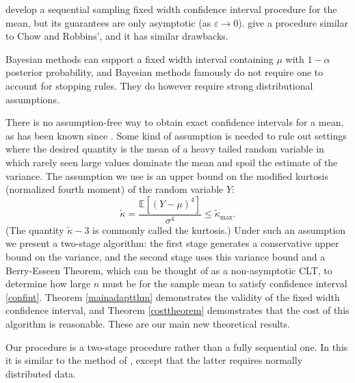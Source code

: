 \documentclass[graybox]{svmult}
\newcommand\e{\mathbb{E}}
\newcommand{\tkappa}{\tilde{\kappa}}
\begin{document}
\cite{ChoRob65a} develop a sequential sampling fixed width confidence interval procedure for the mean, but its guarantees are only asymptotic (as $\varepsilon \to 0$). \cite{MukhDatt1996} give a procedure similar to Chow and Robbins', and it has similar drawbacks.

Bayesian methods can support a fixed width
interval containing $\mu$ with $1-\alpha$ posterior probability, and
Bayesian methods famously do not require one to account
for stopping rules. They do however require strong distributional assumptions.

There is no assumption-free way to obtain exact confidence intervals for a mean,
as has been known since \cite{BahSav56}. Some kind of assumption is needed to rule out settings where the desired quantity is the
mean of a heavy tailed random variable in which
rarely seen large values dominate the mean and spoil the estimate of the variance.
The assumption we use is an upper bound on
the modified kurtosis (normalized fourth moment) of the
random variable $Y$:
\begin{equation} \label{kurtassump}
\tkappa = \frac{\e[(Y-\mu)^4]}{\sigma^4} \le \tkappa_{\max}.
\end{equation}
(The quantity $\tkappa-3$ is commonly called the kurtosis.)  Under such an assumption we present
a two-stage algorithm: the first stage generates
a conservative upper bound on the variance, and the second stage
uses this variance bound and a Berry-Esseen Theorem, which can be thought of as a non-asymptotic CLT, to determine how large $n$ must be for the sample mean to satisfy confidence interval \eqref{confint}.  Theorem \ref{mainadaptthm} demonstrates the validity of the fixed width confidence interval, and Theorem \ref{costtheorem} demonstrates that the cost of this algorithm is reasonable.  These are our main new theoretical results.

Our procedure is a two-stage procedure
rather than a fully sequential one.  In
this it is similar to the method of
\cite{Stei1945a,Stei1949a}, except that
the latter requires normally distributed
data.
\end{document}
